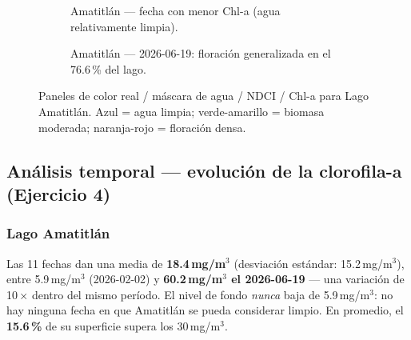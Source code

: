 \documentclass[12pt, a4paper]{article}
\newcommand{\mgm}{\,mg/m$^3$}
\begin{document}
\begin{figure}[H]
  \centering
  \begin{subfigure}{\linewidth}
    \caption{Amatitlán — fecha con menor Chl-a (agua relativamente limpia).}
  \end{subfigure}

  \vspace{6pt}

  \begin{subfigure}{\linewidth}
    \caption{Amatitlán — 2026-06-19: floración generalizada en el 76.6\,\% del lago.}
  \end{subfigure}

  \caption{Paneles de color real / máscara de agua / NDCI / Chl-a para Lago Amatitlán.
           Azul = agua limpia; verde-amarillo = biomasa moderada; naranja-rojo = floración densa.}
  \label{fig:mapas_indices}
\end{figure}

\subsection{Análisis temporal — evolución de la clorofila-a (Ejercicio 4)}

\subsubsection{Lago Amatitlán}

Las 11 fechas dan una media de \textbf{18.4\mgm} (desviación estándar: 15.2\mgm{}),
entre 5.9\mgm{} (2026-02-02) y \textbf{60.2\mgm{} el 2026-06-19} — una variación
de 10\,× dentro del mismo período. El nivel de fondo \emph{nunca} baja de 5.9\mgm:
no hay ninguna fecha en que Amatitlán se pueda considerar limpio. En promedio, el
\textbf{15.6\,\%} de su superficie supera los 30\mgm{}.
\end{document}
